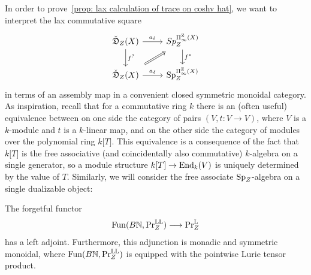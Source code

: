 In order to prove~\cref{prop: lax calculation of trace on coshv hat}, we want to interpret the lax commutative square
  \[
    \begin{tikzcd}
      \coShat_\base(\tset )\arrow[d,"f^?"] \arrow[r,"a_\delta"] & Sp_\base^{\ani{\tset}[\base]}\arrow[d,"f^*"]\\
      \coShat_\base(\tset )\arrow[r,"a_\delta"]\arrow[ru,Rightarrow, shorten <=5pt,shorten >=5pt] & \Sp_\base^{\ani{\tset}[\base]}
    \end{tikzcd}
  \]
  in terms of an assembly map in a convenient closed symmetric monoidal category. As inspiration, recall that for a commutative ring $k$ there is an (often useful) equivalence between on one side the category of pairs $(V,t\colon V\to V)$, where $V$ is a $k$-module and $t$ is a $k$-linear map, and on the other side the category of modules over the polynomial ring $k\lbrack T\rbrack$. This equivalence is a consequence of the fact that $k\lbrack T\rbrack$ is the free associative (and coincidentally also commutative) $k$-algebra on a single generator, so a module structure $k\lbrack T\rbrack\to\operatorname{End}_k(V)$ is uniquely determined by the value of $T$. Similarly, we will consider the free associate $\operatorname{Sp}_Z$-algebra on a single dualizable object:
  \begin{thm}
    The forgetful functor
    \[
      \operatorname{Fun}(B\mathbb{N} ,\mathrm{Pr}^{\mathrm{LL}}_{Z})\longrightarrow\mathrm{Pr}^{\mathrm{L}}_{Z}
    \]
    has a left adjoint. Furthermore, this adjunction is monadic and symmetric monoidal, where $\operatorname{Fun} (B\mathbb{N} ,\mathrm{Pr}^{\mathrm{LL}}_{Z})$ is equipped with the pointwise Lurie tensor product.
  \end{thm}

